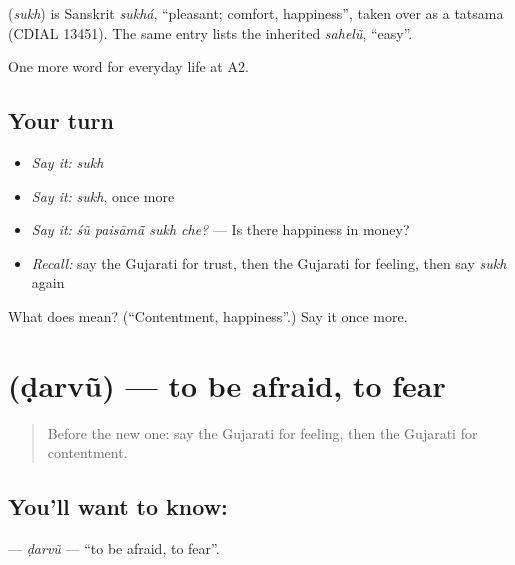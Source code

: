 \begin{cousinweb}
\textbf{} (\emph{sukh}) is Sanskrit \emph{sukhá}, \textquotedblleft{}pleasant; comfort, happiness\textquotedblright{}, taken over as a tatsama (CDIAL 13451). The same entry lists the inherited \emph{sahelũ}, \textquotedblleft{}easy\textquotedblright{}.
\end{cousinweb}

\begin{grammarlens}[title={What you've built}]
One more word for everyday life at A2.
\end{grammarlens}

\subsection*{Your turn}
\begin{itemize}
\raggedright
  \item \emph{Say it:} \emph{sukh}
  \item \emph{Say it:} \emph{sukh}, once more
  \item \emph{Say it:} \emph{śũ paisāmā̃ sukh che?} — Is there happiness in money?
  \item \emph{Recall:} say the Gujarati for trust, then the Gujarati for feeling, then say \emph{sukh} again
\end{itemize}

\begin{tcolorbox}[breakable,colback=teal!4,colframe=teal!35!black,title={Before you move on}]
What does  mean? (\textquotedblleft{}Contentment, happiness\textquotedblright{}.) Say it once more.
\end{tcolorbox}
\section[\texorpdfstring{\gu{ડરવું} (ḍarvũ)}{ડરવું (ḍarvũ)}]{ (ḍarvũ) — to be afraid, to fear}

\label{lesson:GU-C266-darvu}



\begin{quote}
Before the new one: say the Gujarati for feeling, then the Gujarati for contentment.
\end{quote}

\subsection*{You'll want to know: }
\textbf{} — \emph{ḍarvũ} — \textquotedblleft{}to be afraid, to fear\textquotedblright{}.


